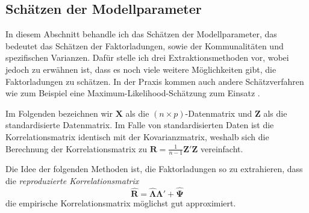 \documentclass[11pt]{scrartcl}
\begin{document}
	\newpage
	\subsection{Schätzen der Modellparameter} \label{Schätzmethoden}
	In diesem Abschnitt behandle ich das Schätzen der Modellparameter, das bedeutet
	das Schätzen der Faktorladungen, sowie der Kommunalitäten und spezifischen Varianzen.
	Dafür stelle ich drei Extraktionsmethoden vor, wobei jedoch zu erwähnen ist, dass es noch viele weitere
	Möglichkeiten gibt, die Faktorladungen zu schätzen. In der Praxis kommen auch
	andere Schätzverfahren wie zum Beispiel eine Maximum-Likelihood-Schätzung zum Einsatz
	\parencite[vgl. Tab. 7.15,][445]{Backhaus.2021}.
	
	Im Folgenden bezeichnen wir $\mathbf{X}$ als die $(n \times p)$-Datenmatrix und
	$\mathbf{Z}$
	als die standardisierte Datenmatrix. Im Falle von standardisierten Daten ist die
	Korrelationsmatrix identisch mit der Kovarianzmatrix, weshalb sich die
	Berechnung
	der Korrelationsmatrix zu $\mathbf{R} = \frac{1}{n - 1}\mathbf{Z'}\mathbf{Z}$
	vereinfacht.
	
	Die Idee der folgenden Methoden ist, die Faktorladungen so zu extrahieren,
	dass die \textit{reproduzierte Korrelationsmatrix}
	\begin{equation} \label{Reproduzierte Korrelationsmatrix}
		\widehat{\mathbf{R}} = \mathbf{\widehat{\Lambda}} \mathbf{\widehat{\Lambda}}' + \widehat{\mathbf{\Psi}}
	\end{equation}
	die empirische Korrelationsmatrix möglichst gut approximiert. 
	
\end{document}
